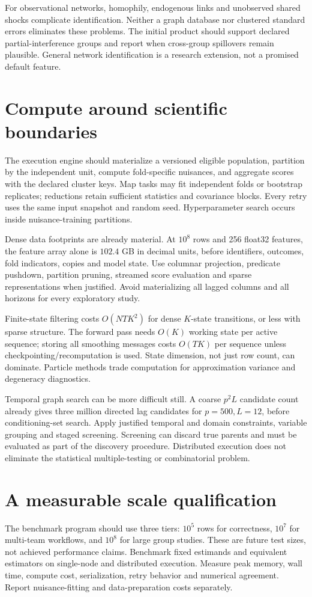 For observational networks, homophily, endogenous links and unobserved
shared shocks complicate identification. Neither a graph database nor
clustered standard errors eliminates these problems. The initial product
should support declared partial-interference groups and report when
cross-group spillovers remain plausible. General network identification
is a research extension, not a promised default feature.

\section{Compute around scientific boundaries}
The execution engine should materialize a versioned eligible population,
partition by the independent unit, compute fold-specific nuisances, and
aggregate scores with the declared cluster keys. Map tasks may fit independent
folds or bootstrap replicates; reductions retain sufficient statistics and
covariance blocks. Every retry uses the same input snapshot and random seed.
Hyperparameter search occurs inside nuisance-training partitions.

Dense data footprints are already material. At $10^8$ rows and 256
float32 features, the feature array alone is $102.4$ GB in decimal units,
before identifiers, outcomes, fold indicators, copies and model state.
Use columnar projection, predicate pushdown, partition pruning, streamed
score evaluation and sparse representations when justified. Avoid materializing
all lagged columns and all horizons for every exploratory study.

Finite-state filtering costs $O(NTK^2)$ for dense $K$-state transitions,
or less with sparse structure. The forward pass needs $O(K)$ working
state per active sequence; storing all smoothing messages costs $O(TK)$
per sequence unless checkpointing/recomputation is used. State dimension,
not just row count, can dominate. Particle methods trade computation for
approximation variance and degeneracy diagnostics.

Temporal graph search can be more difficult still. A coarse
$p^2L$ candidate count already gives three million directed lag candidates
for $p=500,L=12$, before conditioning-set search. Apply justified temporal
and domain constraints, variable grouping and staged screening. Screening
can discard true parents and must be evaluated as part of the discovery
procedure. Distributed execution does not eliminate the statistical
multiple-testing or combinatorial problem.

\section{A measurable scale qualification}
The benchmark program should use three tiers: $10^5$ rows for correctness,
$10^7$ for multi-team workflows, and $10^8$ for large group studies. These
are future test sizes, not achieved performance claims. Benchmark fixed
estimands and equivalent estimators on single-node and distributed execution.
Measure peak memory, wall time, compute cost, serialization, retry behavior
and numerical agreement. Report nuisance-fitting and data-preparation costs
separately.

